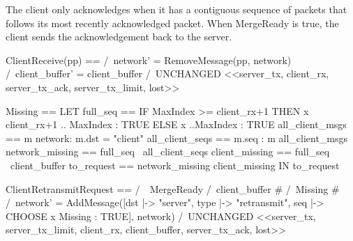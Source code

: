 The client only acknowledges when it has a contiguous sequence of packets that
follows its most recently acknowledged packet. When MergeReady is true, the
client sends the acknowledgement back to the server.\newline

\begin{tla}
ClientReceive(pp) == 
    /\ network' = RemoveMessage(pp, network)
    /\ client_buffer' = client_buffer 
    /\ UNCHANGED <<server_tx, client_rx, 
        server_tx_ack, server_tx_limit, lost>>

Missing == 
    LET 
        full_seq == 
            IF MaxIndex >= client_rx+1 
            THEN 
                {x \in client_rx+1 .. MaxIndex : TRUE}
            ELSE 
                {x ..MaxIndex : TRUE} 
        all_client_msgs == {m \in network: m.dst = "client"}
        all_client_seqs == {m.seq : m \in all_client_msgs}
        network_missing == full_seq \ all_client_seqs
        client_missing == full_seq \ client_buffer
        to_request == network_missing \intersect client_missing
    IN 
        to_request

ClientRetransmitRequest == 
    /\ ~MergeReady
    /\ client_buffer # {}
    /\ Missing # {}
    /\ network' = AddMessage([dst |-> "server", 
                              type |-> "retransmit",
                              seq |-> CHOOSE x \in Missing : TRUE],
                                network)
    /\ UNCHANGED <<server_tx, server_tx_limit, 
        client_rx, client_buffer, server_tx_ack, lost>>
\end{tla}
